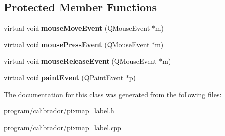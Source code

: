 \subsection*{Protected Member Functions}
\begin{DoxyCompactItemize}
\item 
virtual void {\bfseries mouse\+Move\+Event} (Q\+Mouse\+Event $\ast$m)\hypertarget{classpixmap__label_af8f60d7b1403c8c9d853b2229e9b48f1}{}\label{classpixmap__label_af8f60d7b1403c8c9d853b2229e9b48f1}

\item 
virtual void {\bfseries mouse\+Press\+Event} (Q\+Mouse\+Event $\ast$m)\hypertarget{classpixmap__label_a0d169d888f0188b65f7dbccd2e74da53}{}\label{classpixmap__label_a0d169d888f0188b65f7dbccd2e74da53}

\item 
virtual void {\bfseries mouse\+Release\+Event} (Q\+Mouse\+Event $\ast$m)\hypertarget{classpixmap__label_ab7c9d5229ceeeedc42df50f6b0606e4d}{}\label{classpixmap__label_ab7c9d5229ceeeedc42df50f6b0606e4d}

\item 
virtual void {\bfseries paint\+Event} (Q\+Paint\+Event $\ast$p)\hypertarget{classpixmap__label_aa79740d75a22bd060cc701fb78893751}{}\label{classpixmap__label_aa79740d75a22bd060cc701fb78893751}

\end{DoxyCompactItemize}


The documentation for this class was generated from the following files\+:\begin{DoxyCompactItemize}
\item 
program/calibrador/pixmap\+\_\+label.\+h\item 
program/calibrador/pixmap\+\_\+label.\+cpp\end{DoxyCompactItemize}
